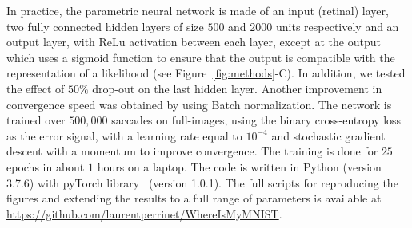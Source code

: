 

In practice, the parametric neural network is made of an input (retinal) layer, two fully connected hidden layers of size $500$ and $2000$ units respectively and an output layer, with ReLu activation between each layer, except at the output which uses a sigmoid function to ensure that the output is compatible with the representation of a likelihood (see  Figure~\ref{fig:methods}-C). 
In addition, we tested \ICANN
\else the effect of $50 \%$ drop-out on the last hidden layer.
Another \fi improvement in convergence speed was obtained by using Batch normalization. The network is trained over $500,000$ saccades on full-images, using the binary cross-entropy loss as the error signal, with a learning rate equal to $10^{-4}$ and stochastic gradient descent with a momentum to improve convergence. The training is done for $25$ epochs in about $1$ hours on a laptop. The code is written in Python (version 3.7.6) with pyTorch library~\citep{Paszke17} (version 1.0.1). The full scripts for reproducing the figures and extending the results to a full range of parameters is available at \url{https://github.com/laurentperrinet/WhereIsMyMNIST}. %
